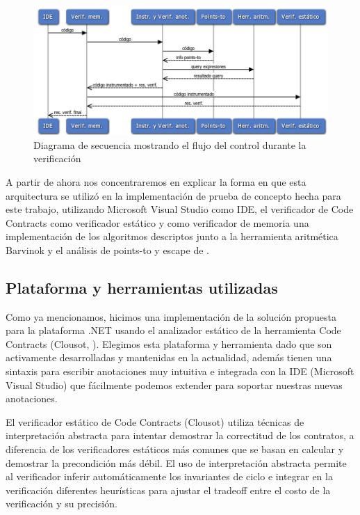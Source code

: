 \documentclass[12pt,a4paper]{article}
\begin{document}
			\begin{figure}[htb]
			\begin{center}
			\includegraphics[scale=0.5]{seqdiag_arq.png}
			\end{center}
			\caption{Diagrama de secuencia mostrando el flujo del control durante la verificación}
			\label{seqarq}
			\end{figure}

			A partir de ahora nos concentraremos en explicar la forma en que esta arquitectura se utilizó en la implementación de prueba de concepto hecha para este trabajo, utilizando Microsoft Visual Studio como IDE, el verificador de Code Contracts como verificador estático y como verificador de memoria una implementación de los algoritmos descriptos junto a la herramienta aritmética Barvinok y el análisis de points-to y escape de \cite{BFGL07}.
		\subsection{Plataforma y herramientas utilizadas}
			Como ya mencionamos, hicimos una implementación de la solución propuesta para la plataforma .NET usando el analizador estático de la herramienta Code Contracts (Clousot, \cite{Ff10}). Elegimos esta plataforma y herramienta dado que son activamente desarrolladas y mantenidas en la actualidad, además tienen una sintaxis para escribir anotaciones muy intuitiva e integrada con la IDE (Microsoft Visual Studio) que fácilmente podemos extender para soportar nuestras nuevas anotaciones.

			El verificador estático de Code Contracts (Clousot) utiliza técnicas de interpretación abstracta para intentar demostrar la correctitud de los contratos, a diferencia de los verificadores estáticos más comunes que se basan en calcular y demostrar la precondición más débil. El uso de interpretación abstracta permite al verificador inferir automáticamente los invariantes de ciclo e integrar en la verificación diferentes heurísticas para ajustar el tradeoff entre el costo de la verificación y su precisión.
\end{document}

